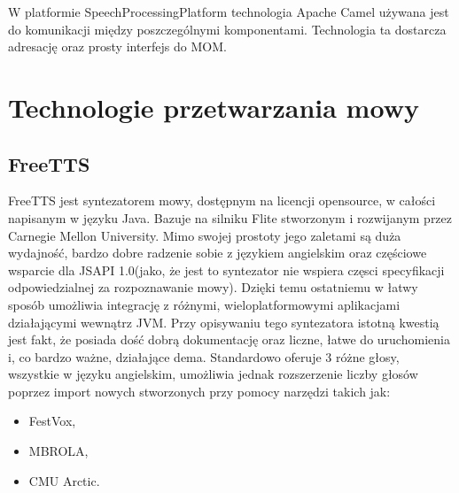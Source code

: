 W platformie SpeechProcessingPlatform technologia Apache Camel używana jest do komunikacji między poszczególnymi komponentami. Technologia ta dostarcza adresację oraz prosty interfejs do MOM.
	
\section{Technologie przetwarzania mowy}		
\subsection{FreeTTS}
FreeTTS \cite{freettssite} jest syntezatorem mowy, dostępnym na licencji opensource, w całości napisanym w języku Java. Bazuje na silniku Flite stworzonym i rozwijanym przez Carnegie Mellon University. Mimo swojej prostoty jego zaletami są duża wydajność, bardzo dobre radzenie sobie z językiem angielskim oraz częściowe wsparcie dla JSAPI 1.0(jako, że jest to syntezator nie wspiera częsci specyfikacji odpowiedzialnej za rozpoznawanie mowy). Dzięki temu ostatniemu w łatwy sposób umożliwia integrację z różnymi, wieloplatformowymi aplikacjami działającymi wewnątrz JVM. Przy opisywaniu tego syntezatora istotną kwestią jest fakt, że posiada dość dobrą dokumentację oraz liczne, łatwe do uruchomienia i, co bardzo ważne, działające dema. Standardowo oferuje 3 różne głosy, wszystkie w języku angielskim, umożliwia jednak rozszerzenie liczby głosów poprzez import nowych stworzonych przy pomocy narzędzi takich jak:
\begin{itemize}
	\item FestVox,
	\item MBROLA,
	\item CMU Arctic.
\end{itemize}    

